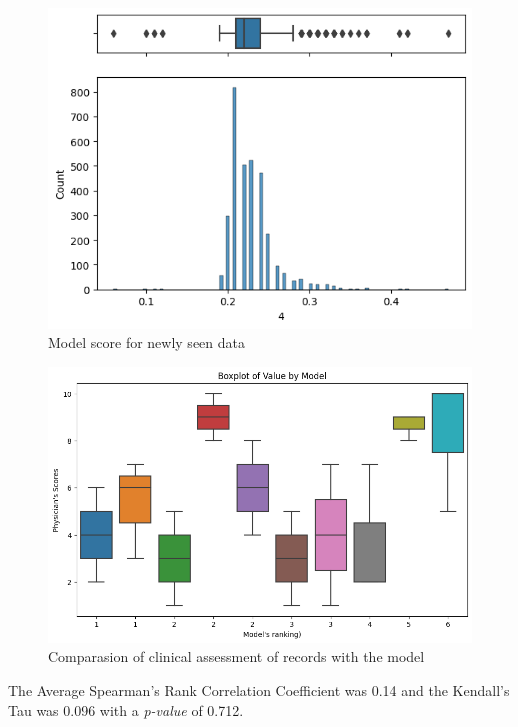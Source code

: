 \begin{figure}[htbp]
\centering
\caption{Model score for newly seen data}\label{fig:scores} 
\includegraphics[scale=0.78]{imgs/Scoring.png}
\end{figure}

\begin{figure}[htbp]
\centering
\caption{Comparasion of clinical assessment of records with the model}\label{fig:clinical} 
\includegraphics[scale=0.52]{imgs/clinical_assessment_dataqual.png}
\end{figure}

The Average Spearman's Rank Correlation Coefficient was 0.14 and the Kendall's Tau was 0.096 with a \textit{p-value} of 0.712.
